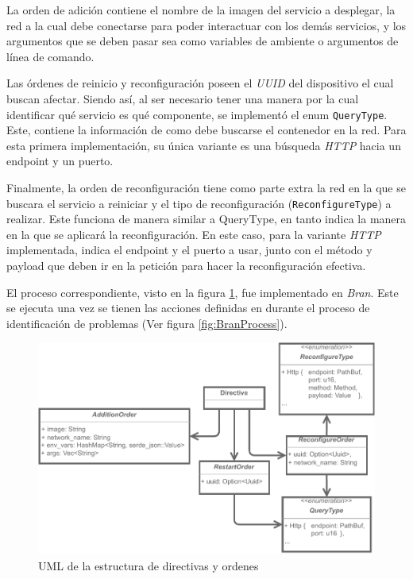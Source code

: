 La orden de adición contiene el nombre de la imagen del servicio a desplegar, la red a la cual debe conectarse para poder interactuar con los demás servicios, y los argumentos que se deben pasar sea como variables de ambiente o argumentos de línea de comando. 

Las órdenes de reinicio y reconfiguración poseen el \textit{UUID} del dispositivo el cual buscan afectar. Siendo así, al ser necesario tener una manera por la cual identificar qué servicio es qué componente, se implementó el enum \texttt{QueryType}. Este, contiene la información de como debe buscarse el contenedor en la red. Para esta primera implementación, su única variante es una búsqueda \textit{HTTP} hacia un endpoint y un puerto.

Finalmente, la orden de reconfiguración tiene como parte extra la red en la que se buscara el servicio a reiniciar y el tipo de reconfiguración (\texttt{ReconfigureType}) a realizar. Este funciona de manera similar a QueryType, en tanto indica la manera en la que se aplicará la reconfiguración. En este caso, para la variante \textit{HTTP} implementada, indica el endpoint y el puerto a usar, junto con el método y payload que deben ir en la petición para hacer la reconfiguración efectiva.

El proceso correspondiente, visto en la figura \ref{fig:BranExecution}, fue implementado en \textit{Bran}. Este se ejecuta una vez se tienen las acciones definidas en durante el proceso de identificación de problemas (Ver figura \ref{fig:BranProcess}).

\begin{figure}[ht]
    \centering
    \caption{UML de la estructura de directivas y ordenes}
    \label{fig:BranExecution}
    \includegraphics[width=0.8\linewidth]{images/Directives.pdf}
\end{figure}


